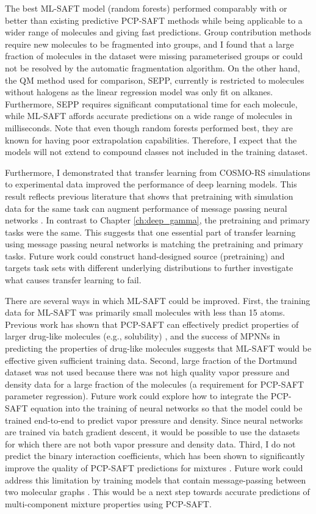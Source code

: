 The best ML-SAFT model (random forests) performed comparably with or better than existing predictive PCP-SAFT methods while being applicable to a wider range of molecules and giving fast predictions. Group contribution methods require new molecules to be fragmented into groups, and I found that a large fraction of molecules in the dataset were missing parameterised groups or could not be resolved by the automatic fragmentation algorithm. On the other hand, the QM method used for comparison, SEPP, currently is restricted to molecules without halogens as the linear regression model was only fit on alkanes. Furthermore, SEPP requires significant computational time for each molecule, while ML-SAFT affords accurate predictions on a wide range of molecules in milliseconds. Note that even though random forests performed best, they are known for having poor extrapolation capabilities. Therefore, I expect that the models will not extend to compound classes not included in the training dataset.

Furthermore, I demonstrated that transfer learning from COSMO-RS simulations to experimental data improved the performance of deep learning models. This result reflects previous literature that shows that pretraining with simulation data for the same task can augment performance of message passing neural networks \cite{Vermeire2021}. In contrast to Chapter \ref{ch:deep_gamma}, the pretraining and primary tasks were the  same. This suggests that one essential part of transfer learning using message passing neural networks is matching the pretraining and primary tasks. Future work could construct hand-designed source (pretraining) and targets task sets with different underlying distributions to further investigate what causes transfer learning to fail.

There are several ways in which ML-SAFT could be improved. First, the training data for ML-SAFT was primarily small molecules with less than 15 atoms. Previous work has shown that PCP-SAFT can effectively predict properties of larger drug-like molecules (e.g., solubility) \cite{Klajmon2020}, and the success of MPNNs in predicting the properties of drug-like molecules suggests that ML-SAFT would be effective given sufficient training data. Second, large fraction of the Dortmund dataset was not used because there was not high quality vapor pressure and density data for a large fraction of the molecules (a requirement for PCP-SAFT parameter regression). Future work could explore how to integrate the PCP-SAFT equation into the training of neural networks so that the model could be trained end-to-end to predict vapor pressure and density. Since neural networks are trained via batch gradient descent, it would be possible to use the datasets for which there are not both vapor pressure and density data. Third, I do not predict the binary interaction coefficients, which has been shown to significantly improve the quality of PCP-SAFT predictions for mixtures \cite{Cripwell2017}. Future work could address this limitation by training models that contain message-passing between two molecular graphs \cite{Qin2023}. This would be a next step towards accurate predictions of multi-component mixture properties using PCP-SAFT.


